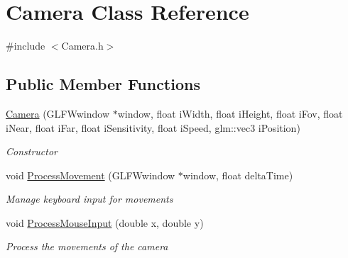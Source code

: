 \hypertarget{class_camera}{}\section{Camera Class Reference}
\label{class_camera}


{\ttfamily \#include $<$Camera.\+h$>$}

\subsection*{Public Member Functions}
\begin{DoxyCompactItemize}
\item 
\mbox{\hyperlink{class_camera_a1c40f8c6fe27e69dab22d7b6a6f18b25}{Camera}} (G\+L\+F\+Wwindow $\ast$window, float i\+Width, float i\+Height, float i\+Fov, float i\+Near, float i\+Far, float i\+Sensitivity, float i\+Speed, glm\+::vec3 i\+Position)
\begin{DoxyCompactList}\small\item\em Constructor \end{DoxyCompactList}\item 
void \mbox{\hyperlink{class_camera_a47c49a30f4859189b08fe7d21bdc2657}{Process\+Movement}} (G\+L\+F\+Wwindow $\ast$window, float delta\+Time)
\begin{DoxyCompactList}\small\item\em Manage keyboard input for movements \end{DoxyCompactList}\item 
void \mbox{\hyperlink{class_camera_a160190b78a1b314c5646b3eb646a48f7}{Process\+Mouse\+Input}} (double x, double y)
\begin{DoxyCompactList}\small\item\em Process the movements of the camera \end{DoxyCompactList}\end{DoxyCompactItemize}
